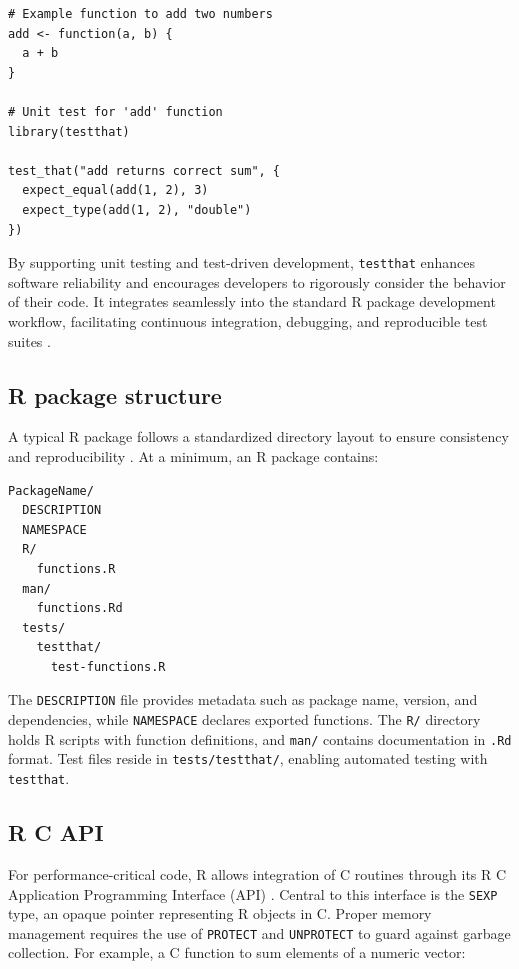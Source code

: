 \begin{verbatim}
# Example function to add two numbers
add <- function(a, b) {
  a + b
}

# Unit test for 'add' function
library(testthat)

test_that("add returns correct sum", {
  expect_equal(add(1, 2), 3)
  expect_type(add(1, 2), "double")
})
\end{verbatim}

By supporting unit testing and test-driven development, \texttt{testthat} enhances software reliability and encourages developers to rigorously consider the behavior of their code. It integrates seamlessly into the standard R package development workflow, facilitating continuous integration, debugging, and reproducible test suites \cite{wickham2015rpackages}.

\subsection{R package structure}

A typical R package follows a standardized directory layout to ensure consistency and reproducibility \cite{wickham2015rpackages}. At a minimum, an R package contains:

\begin{verbatim}
PackageName/
  DESCRIPTION
  NAMESPACE
  R/
    functions.R
  man/
    functions.Rd
  tests/
    testthat/
      test-functions.R
\end{verbatim}

The \texttt{DESCRIPTION} file provides metadata such as package name, version, and dependencies, while \texttt{NAMESPACE} declares exported functions. The \texttt{R/} directory holds R scripts with function definitions, and \texttt{man/} contains documentation in \texttt{.Rd} format. Test files reside in \texttt{tests/testthat/}, enabling automated testing with \texttt{testthat}.

\subsection{R C API}

For performance-critical code, R allows integration of C routines through its R C Application Programming Interface (API) \cite{R-base}. Central to this interface is the \texttt{SEXP} type, an opaque pointer representing R objects in C. Proper memory management requires the use of \texttt{PROTECT} and \texttt{UNPROTECT} to guard against garbage collection. For example, a C function to sum elements of a numeric vector:

